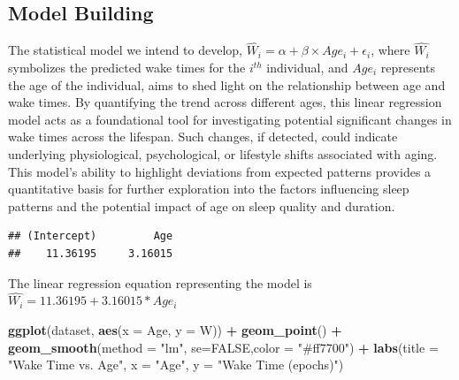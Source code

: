 \documentclass[
]{article}
\newenvironment{Shaded}{\begin{snugshade}}{\end{snugshade}}
\newcommand{\AttributeTok}[1]{\textcolor[rgb]{0.13,0.29,0.53}{#1}}
\newcommand{\ConstantTok}[1]{\textcolor[rgb]{0.56,0.35,0.01}{#1}}
\newcommand{\FunctionTok}[1]{\textcolor[rgb]{0.13,0.29,0.53}{\textbf{#1}}}
\newcommand{\NormalTok}[1]{#1}
\newcommand{\OtherTok}[1]{\textcolor[rgb]{0.56,0.35,0.01}{#1}}
\newcommand{\SpecialCharTok}[1]{\textcolor[rgb]{0.81,0.36,0.00}{\textbf{#1}}}
\newcommand{\StringTok}[1]{\textcolor[rgb]{0.31,0.60,0.02}{#1}}
\begin{document}
\hypertarget{model-building-1}{%
\subsection{Model Building}\label{model-building-1}}

The statistical model we intend to develop,
\(\hat{W_{i}} = \alpha + \beta \times Age_{i} + \epsilon_{i}\), where
\(\hat{W_{i}}\) symbolizes the predicted wake times for the \(i^{th}\)
individual, and \(Age_{i}\) represents the age of the individual, aims
to shed light on the relationship between age and wake times. By
quantifying the trend across different ages, this linear regression
model acts as a foundational tool for investigating potential
significant changes in wake times across the lifespan. Such changes, if
detected, could indicate underlying physiological, psychological, or
lifestyle shifts associated with aging. This model's ability to
highlight deviations from expected patterns provides a quantitative
basis for further exploration into the factors influencing sleep
patterns and the potential impact of age on sleep quality and duration.

\begin{Shaded}
\end{Shaded}

\begin{verbatim}
## (Intercept)         Age 
##    11.36195     3.16015
\end{verbatim}

The linear regression equation representing the model is
\(\hat{W_{i}} = 11.36195 + 3.16015*Age_{i}\)

\begin{Shaded}
\begin{Highlighting}[]
\FunctionTok{ggplot}\NormalTok{(dataset, }\FunctionTok{aes}\NormalTok{(}\AttributeTok{x =}\NormalTok{ Age, }\AttributeTok{y =}\NormalTok{ W)) }\SpecialCharTok{+} 
  \FunctionTok{geom\_point}\NormalTok{() }\SpecialCharTok{+} 
  \FunctionTok{geom\_smooth}\NormalTok{(}\AttributeTok{method =} \StringTok{"lm"}\NormalTok{, }\AttributeTok{se=}\ConstantTok{FALSE}\NormalTok{,}\AttributeTok{color =} \StringTok{"\#ff7700"}\NormalTok{) }\SpecialCharTok{+} 
  \FunctionTok{labs}\NormalTok{(}\AttributeTok{title =} \StringTok{"Wake Time vs. Age"}\NormalTok{, }\AttributeTok{x =} \StringTok{"Age"}\NormalTok{, }\AttributeTok{y =} \StringTok{"Wake Time (epochs)"}\NormalTok{)}
\end{Highlighting}
\end{Shaded}
\end{document}
